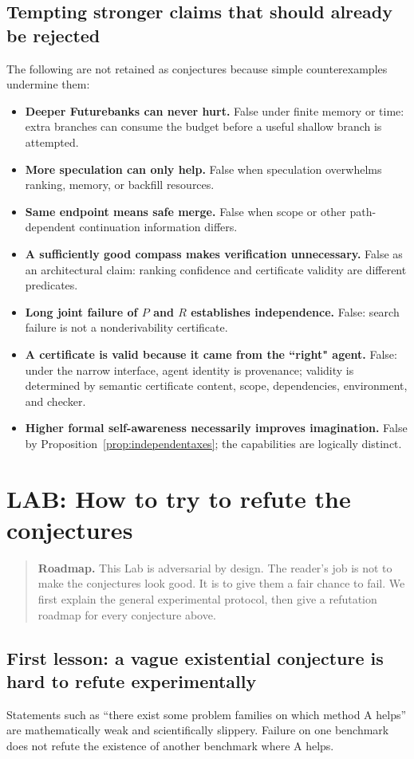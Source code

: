 \documentclass[11pt,openany]{book}
\theoremstyle{definition}
\theoremstyle{remark}
\newenvironment{roadmap}{\begin{quote}\small\color{deepblue}\textbf{Roadmap.} }{\end{quote}}
\begin{document}
\section{Tempting stronger claims that should already be rejected}
The following are not retained as conjectures because simple counterexamples undermine them:
\begin{itemize}
\item \textbf{Deeper Futurebanks can never hurt.} False under finite memory or time: extra branches can consume the budget before a useful shallow branch is attempted.
\item \textbf{More speculation can only help.} False when speculation overwhelms ranking, memory, or backfill resources.
\item \textbf{Same endpoint means safe merge.} False when scope or other path-dependent continuation information differs.
\item \textbf{A sufficiently good compass makes verification unnecessary.} False as an architectural claim: ranking confidence and certificate validity are different predicates.
\item \textbf{Long joint failure of $P$ and $R$ establishes independence.} False: search failure is not a nonderivability certificate.
\item \textbf{A certificate is valid because it came from the ``right" agent.} False: under the narrow interface, agent identity is provenance; validity is determined by semantic certificate content, scope, dependencies, environment, and checker.
\item \textbf{Higher formal self-awareness necessarily improves imagination.} False by Proposition~\ref{prop:independentaxes}; the capabilities are logically distinct.
\end{itemize}

\chapter{LAB: How to try to refute the conjectures}
\begin{roadmap}
This Lab is adversarial by design. The reader's job is not to make the conjectures look good. It is to give them a fair chance to fail. We first explain the general experimental protocol, then give a refutation roadmap for every conjecture above.
\end{roadmap}

\section{First lesson: a vague existential conjecture is hard to refute experimentally}
Statements such as ``there exist some problem families on which method A helps'' are mathematically weak and scientifically slippery. Failure on one benchmark does not refute the existence of another benchmark where A helps.
\end{document}
